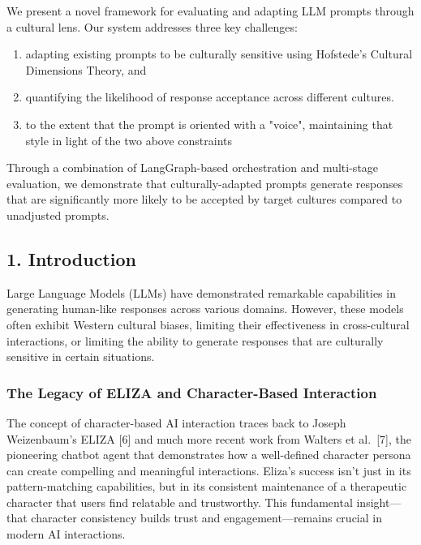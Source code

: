 \documentclass[
]{article}
\providecommand{\tightlist}{%
  \setlength{\itemsep}{0pt}\setlength{\parskip}{0pt}}
\begin{document}
We present a novel framework for evaluating and adapting LLM prompts
through a cultural lens. Our system addresses three key challenges:

\begin{enumerate}
\tightlist
\item
adapting existing prompts to be culturally sensitive using Hofstede's
Cultural Dimensions Theory, and 
\item
quantifying the likelihood of
response acceptance across different cultures. 
\item 
to the extent that the prompt is oriented with a "voice", maintaining that style in light of the two above constraints
\end{enumerate}

Through a combination of LangGraph-based orchestration and multi-stage 
evaluation, we demonstrate that culturally-adapted prompts generate 
responses that are significantly more likely to be accepted by target 
cultures compared to unadjusted prompts.

\subsection{1. Introduction}\label{introduction}

Large Language Models (LLMs) have demonstrated remarkable capabilities
in generating human-like responses across various domains. However,
these models often exhibit Western cultural biases, limiting their
effectiveness in cross-cultural interactions, or limiting the ability to
generate responses that are culturally sensitive in certain situations.

\subsubsection{The Legacy of ELIZA and Character-Based
Interaction}\label{the-legacy-of-eliza-and-character-based-interaction}

The concept of character-based AI interaction traces back to Joseph
Weizenbaum's ELIZA {[}6{]} and much more recent work from Walters et
al.~{[}7{]}, the pioneering chatbot agent that demonstrates how a
well-defined character persona can create compelling and meaningful
interactions. Eliza's success isn't just in its pattern-matching
capabilities, but in its consistent maintenance of a therapeutic
character that users find relatable and trustworthy. This fundamental
insight---that character consistency builds trust and
engagement---remains crucial in modern AI interactions.
\end{document}
